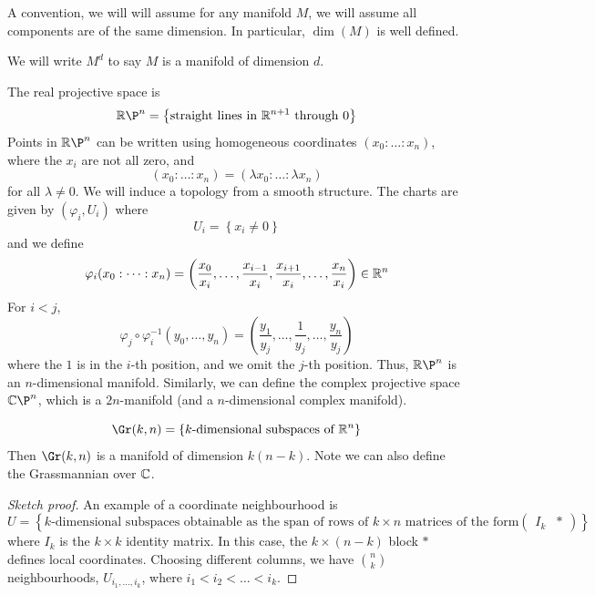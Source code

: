 \documentclass{article}
\begin{document}
\lec


A convention, we will will assume for any manifold \(M\), we will assume all components are of the same dimension. In particular, \(\dim(M)\) is well defined.

\begin{notation}
    We will write \(M^d\) to say \(M\) is a manifold of dimension \(d\).
\end{notation}

\begin{example}
     The real projective space is
    \[\R\P^n = \left\{\text{straight lines in }\R^{n+1}\text{ through }0\right\}\]
    Points in \(\R\P^n\) can be written using homogeneous coordinates \((x_0 : \dots : x_n)\), where the \(x_i\) are not all zero, and
    \[(x_0 : \dots : x_n) = (\lambda x_0 : \dots : \lambda x_n)\]
    for all \(\lambda \ne 0\). We will induce a topology from a smooth structure. The charts are given by \((\varphi_i, U_i)\) where
    \[U_i = \left\{x_i \ne 0\right\}\]
    and we define
    \[\varphi_i(x_0:\dots:x_n) = \left(\frac{x_0}{x_i}, \dots, \frac{x_{i-1}}{x_i},\frac{x_{i+1}}{x_i}, \dots, \frac{x_n}{x_i}\right) \in \mathbb{R}^n\]
    For \(i < j\), 
    \[\varphi_j \circ \varphi_i^{-1}(y_0, \dots, y_n) = \left(\frac{y_1}{y_j}, \dots, \frac{1}{y_j}, \dots, \frac{y_n}{y_j}\right)\]
    where the \(1\) is in the \(i\)-th position, and we omit the \(j\)-th position. Thus, \(\R\P^n\) is an \(n\)-dimensional manifold. Similarly, we can define the complex projective space \(\C\P^n\), which is a \(2n\)-manifold (and a \(n\)-dimensional complex manifold).
\end{example}

\begin{example}
    [Grassmannian]
    \[\Gr(k, n) = \left\{k\text{-dimensional subspaces of }\R^n\right\}\]
    Then \(\Gr(k, n)\) is a manifold of dimension \(k(n - k)\). Note we can also define the Grassmannian over \(\mathbb{C}\).
\end{example}

\begin{proof}
    [Sketch proof] An example of a coordinate neighbourhood is
    \[U = \left\{k\text{-dimensional subspaces obtainable as the span of rows of }k \times n\text{ matrices of the form} \begin{pmatrix}
        I_k & *
    \end{pmatrix}\right\}\]
    where \(I_k\) is the \(k \times k\) identity matrix. In this case, the \(k \times (n-k)\) block \(*\) defines local coordinates. Choosing different columns, we have \({n \choose k}\) neighbourhoods, \(U_{i_1, \dots, i_k}\), where \(i_1 < i_2 < \dots < i_k\).
\end{proof}
\end{document}
